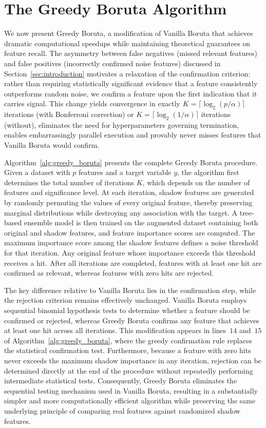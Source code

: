 \documentclass[runningheads]{llncs}
\begin{document}
\section{The Greedy Boruta Algorithm}
\label{sec:method}

We now present Greedy Boruta, a modification of Vanilla Boruta that achieves dramatic computational speedups while maintaining theoretical guarantees on feature recall. The asymmetry between false negatives (missed relevant features) and false positives (incorrectly confirmed noise features) discussed in Section~\ref{sec:introduction} motivates a relaxation of the confirmation criterion: rather than requiring statistically significant evidence that a feature consistently outperforms random noise, we confirm a feature upon the first indication that it carries signal. This change yields convergence in exactly $K = \lceil \log_2(p/\alpha) \rceil$ iterations (with Bonferroni correction) or $K = \lceil \log_2(1/\alpha) \rceil$ iterations (without), eliminates the need for hyperparameters governing termination, enables embarrassingly parallel execution and provably never misses features that Vanilla Boruta would confirm.

Algorithm~\ref{alg:greedy_boruta} presents the complete Greedy Boruta procedure. Given a dataset with $p$ features and a target variable $y$, the algorithm first determines the total number of iterations $K$, which depends on the number of features and significance level. At each iteration, shadow features are generated by randomly permuting the values of every original feature, thereby preserving marginal distributions while destroying any association with the target. A tree-based ensemble model is then trained on the augmented dataset containing both original and shadow features, and feature importance scores are computed. The maximum importance score among the shadow features defines a noise threshold for that iteration. Any original feature whose importance exceeds this threshold receives a hit. After all iterations are completed, features with at least one hit are confirmed as relevant, whereas features with zero hits are rejected.

The key difference relative to Vanilla Boruta lies in the confirmation step, while the rejection criterion remains effectively unchanged. Vanilla Boruta employs sequential binomial hypothesis tests to determine whether a feature should be confirmed or rejected, whereas Greedy Boruta confirms any feature that achieves at least one hit across all iterations. This modification appears in lines~$14$ and~$15$ of Algorithm~\ref{alg:greedy_boruta}, where the greedy confirmation rule replaces the statistical confirmation test. Furthermore, because a feature with zero hits never exceeds the maximum shadow importance in any iteration, rejection can be determined directly at the end of the procedure without repeatedly performing intermediate statistical tests. Consequently, Greedy Boruta eliminates the sequential testing mechanism used in Vanilla Boruta, resulting in a substantially simpler and more computationally efficient algorithm while preserving the same underlying principle of comparing real features against randomized shadow features.
\end{document}
